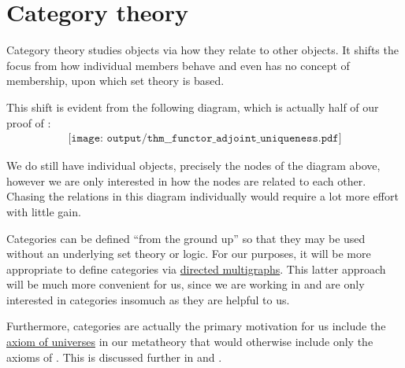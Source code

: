 \section{Category theory}\label{sec:category_theory}

Category theory studies objects via how they relate to other objects. It shifts the focus from how individual members behave and even has no concept of membership, upon which set theory is based.

This shift is evident from the following diagram, which is actually half of our proof of :
\begin{equation*}
  \begin{aligned}
    \texttt{[image: output/thm\_\_functor\_adjoint\_uniqueness.pdf]}
  \end{aligned}
\end{equation*}

We do still have individual objects, precisely the nodes of the diagram above, however we are only interested in how the nodes are related to each other. Chasing the relations in this diagram individually would require a lot more effort with little gain.

Categories can be defined \enquote{from the ground up} so that they may be used without an underlying set theory or logic. For our purposes, it will be more appropriate to define categories via \hyperref[def:directed_multigraph]{directed multigraphs}. This latter approach will be much more convenient for us, since we are working in \hyperref[def:axiom_of_universes]{} and are only interested in categories insomuch as they are helpful to us.

Furthermore, categories are actually the primary motivation for us include the \hyperref[def:axiom_of_universes]{axiom of universes} in our metatheory that would otherwise include only the axioms of \hyperref[def:zfc]{}. This is discussed further in  and .

